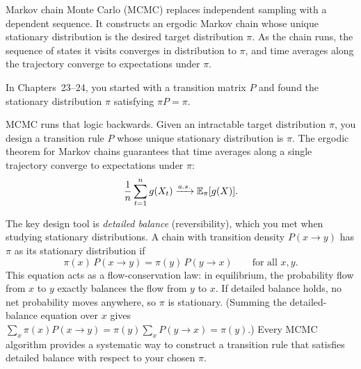 Markov chain Monte Carlo (MCMC) replaces independent sampling with a dependent sequence.
It constructs an ergodic Markov chain whose unique stationary distribution is the desired target distribution $\pi$. As the chain runs,
the sequence of states it visits converges in distribution to $\pi$, and time averages
along the trajectory converge to expectations under $\pi$.
\begin{connectionbox}
In Chapters~23--24, you started with a transition matrix $P$ and found
the stationary distribution $\pi$ satisfying $\pi P = \pi$.

MCMC runs that logic backwards. Given an intractable target distribution $\pi$,
you design a transition rule $P$ whose unique stationary distribution is $\pi$.
The ergodic theorem for Markov chains guarantees
that time averages along a single trajectory converge to expectations under $\pi$:
\[
  \frac1n \sum_{t=1}^n g(X_t) \xrightarrow{a.s.} \operatorname{\mathbb{E}}_\pi[g(X)].
\]
\end{connectionbox}
The key design tool is \emph{detailed balance} (reversibility), which you met
when studying stationary distributions. A chain with transition density
$P(x\to y)$ has $\pi$ as its stationary distribution if
\[
  \pi(x)\,P(x \to y) = \pi(y)\,P(y \to x) \qquad \text{for all } x,y.
\]
This equation acts as a flow-conservation law: in equilibrium, the probability flow from
$x$ to $y$ exactly balances the flow from $y$ to $x$. If detailed balance
holds, no net probability moves anywhere, so $\pi$ is stationary. (Summing
the detailed-balance equation over $x$ gives $\sum_x \pi(x)P(x\to y) = \pi(y)\sum_x P(y\to x) = \pi(y)$.)
Every MCMC algorithm provides a systematic way to construct a transition rule that satisfies
detailed balance with respect to your chosen $\pi$.
